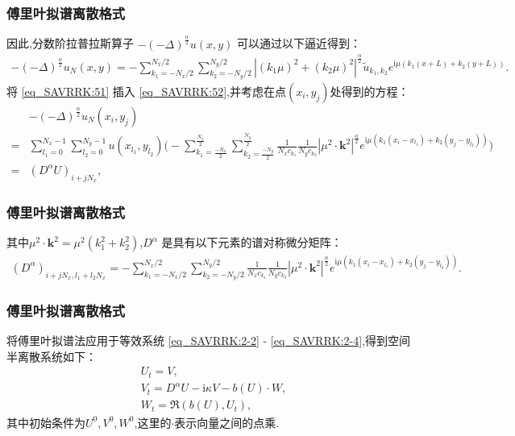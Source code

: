 \documentclass[aspectratio=169]{beamer}
\numberwithin{theorem}{section} %
\begin{document}
\begin{frame}\frametitle{傅里叶拟谱离散格式}
	
因此,分数阶拉普拉斯算子 $-(-\Delta)^{\frac{\alpha}{2}} u(x, y)$ 可以通过以下逼近得到：
\begin{align}\label{eq_SAVRRK:52}
-(-\Delta)^{\frac{\alpha}{2}} u_{N}\left(x, y\right)=-\sum\limits_{k_{1}=-N_{x} / 2}^{N_{x} / 2} \sum\limits_{k_{2}=-N_{y} / 2}^{N_{y} / 2}\left|\left(k_{1} \mu\right)^{2}+\left(k_{2} \mu\right)^{2}\right|^{\frac{\alpha}{2}} \tilde{u}_{k_{1}, k_{2}} e^{\mathrm{i}\mu\left( k_{1} (x+L)+k_{2}(y+L)\right)}.
\end{align}
将 \eqref{eq_SAVRRK:51} 插入 \eqref{eq_SAVRRK:52},并考虑在点$(x_i,y_j)$处得到的方程：
\begin{align}
&-(-\Delta)^{\frac{\alpha}{2}} u_{N}\left(x_{i}, y_{j}\right)\nonumber\\
=&\sum\limits_{l_{1}=0}^{N_{x}-1} \sum\limits_{l_{2}=0}^{N_{y}-1}u(x_{l_{1}}, y_{l_{2}})\Big(-\sum\limits_{k_{1}=\frac{-N_{x}}{2}}^{\frac{N_{x}}{2}} \sum\limits_{k_{2}=\frac{-N_{y}}{2}}^{\frac{N_{y}}{2}} \frac{1}{N_{x} c_{k_{1}}} \frac{1}{N_{y} c_{k_{2}}}\left|\mu^{2} \cdot \mathbf{k}^{2}\right|^{\frac{\alpha}{2}} e^{\mathrm{i} \mu\left(k_{1}\left(x_{i}-x_{l_{1}}\right)+k_{2}\left(y_{j}-y_{l_{2}}\right)\right)}\Big)\nonumber\\
=&\left(D^{\alpha}U\right)_{i+j N_{x}},\label{eq_SAVRRK:53}
\end{align}
\end{frame}

\begin{frame}\frametitle{傅里叶拟谱离散格式}
其中$\mu^{2} \cdot \mathbf{k}^{2}=\mu^{2}\left(k_{1}^{2}+k_{2}^{2}\right)$,$D^{\alpha}$ 是具有以下元素的谱对称微分矩阵：
\begin{align}\label{eq_SAVRRK:54}
\left(D^{\alpha}\right)_{i+j N_{x}, l_{1}+l_{2} N_{x}}=-\sum\limits_{k_{1}=-N_{x} / 2}^{N_{x} / 2} \sum\limits_{k_{2}=-N_{y} / 2}^{N_{y} / 2}\frac{1}{N_{x} c_{k_{1}}} \frac{1}{N_{y} c_{k_{2}}}\left|\mu^{2} \cdot \mathbf{k}^{2}\right|^{\frac{\alpha}{2}} e^{\mathrm{i}\mu\left(k_{1}\left(x_{i}-x_{l_{1}}\right)+k_{2}\left(y_{j}-y_{l_{2}}\right)\right)}.
\end{align}
\end{frame}

\begin{frame}\frametitle{傅里叶拟谱离散格式}
将傅里叶拟谱法应用于等效系统 \eqref{eq_SAVRRK:2-2} - \eqref{eq_SAVRRK:2-4},得到空间半离散系统如下：
\begin{align}
& U_t=V, \label{eq_SAVRRK:3-9}\\
& V_t=D^{\alpha} U-\mathrm{i}\kappa V- b(U) \cdot W, \label{eq_SAVRRK:3-10}\\
& W_t=\Re\left(b(U), U_t\right),\label{eq_SAVRRK:3-11}
\end{align}
其中初始条件为$U^0, V^0, W^0$,这里的$\cdot$表示向量之间的点乘.
\end{frame}
\end{document}
